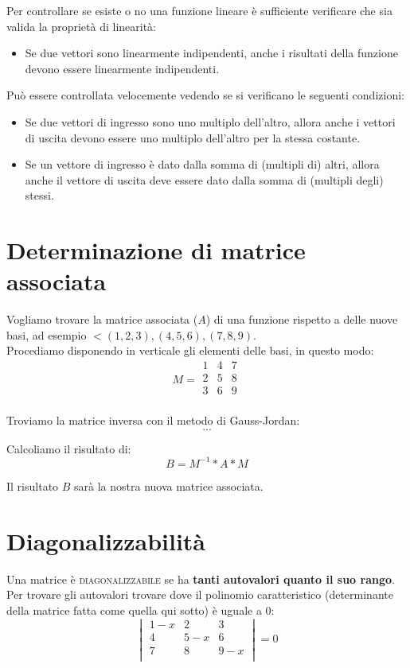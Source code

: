 \documentclass{article}
\begin{document}
Per controllare se esiste o no una funzione lineare è sufficiente verificare che sia valida la proprietà di linearità:\\
\begin{itemize}
\item Se due vettori sono linearmente indipendenti, anche i risultati della funzione devono essere linearmente indipendenti.
\end{itemize}
Può essere controllata velocemente vedendo se si verificano le seguenti condizioni:
\begin{itemize}
\item Se due vettori di ingresso sono uno multiplo dell'altro, allora anche i vettori di uscita devono essere uno multiplo dell'altro per la stessa costante.
\item Se un vettore di ingresso è dato dalla somma di (multipli di) altri, allora anche il vettore di uscita deve essere dato dalla somma di (multipli degli) stessi.
\end{itemize}

\section{Determinazione di matrice associata}

Vogliamo trovare la matrice associata (\(A\)) di una funzione rispetto a delle nuove basi, ad esempio \(< (1, 2, 3), (4, 5, 6), (7, 8, 9)\).\\

Procediamo disponendo in verticale gli elementi delle basi, in questo modo:
\[
    M = 
    \begin{matrix}
        1 & 4 & 7 \\
        2 & 5 & 8 \\
        3 & 6 & 9 \\
    \end{matrix}
\]

Troviamo la matrice inversa con il metodo di Gauss-Jordan:
\[
...
\]

Calcoliamo il risultato di:
\[
    B = M^{-1} * A * M
\]

Il risultato \(B\) sarà la nostra nuova matrice associata.

\section{Diagonalizzabilità}
Una matrice è \textsc{diagonalizzabile} se ha \textbf{tanti autovalori quanto il suo rango}.\\
Per trovare gli autovalori trovare dove il polinomio caratteristico (determinante della matrice fatta come quella qui sotto) è uguale a 0:
\[
    \begin{vmatrix}
        1 - x & 2     & 3 \\
        4     & 5 - x & 6 \\
        7     & 8     & 9 - x \\
    \end{vmatrix}
    = 0
\]
\end{document}
